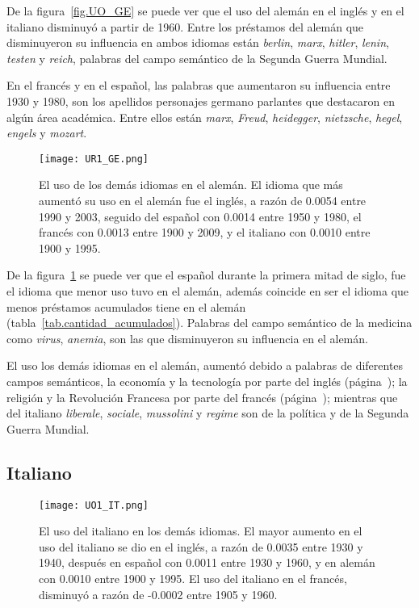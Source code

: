 De la figura~\ref{fig.UO_GE} se puede ver que el uso del alemán en el
inglés y en el italiano disminuyó a partir de 1960. Entre los préstamos del alemán que disminuyeron su influencia en ambos idiomas están \textit{berlin}, \textit{marx}, \textit{hitler}, \textit{lenin}, \textit{testen} y \textit{reich}, palabras del campo semántico de la Segunda Guerra Mundial. 

En el francés y en el español, las palabras que aumentaron su influencia entre 1930 y 1980,  son los apellidos personajes germano parlantes que destacaron en algún área académica. Entre ellos están \textit{marx}, \textit{Freud}, \textit{heidegger}, \textit{nietzsche}, \textit{hegel}, \textit{engels} y \textit{mozart}.

\label{GE-D}


\begin{figure}[h!]
	\centering
	\texttt{[image: UR1\_GE.png]}
	\caption{El uso de los demás idiomas en el alemán. El idioma que más aumentó su uso en el alemán fue el inglés, a razón de 0.0054   entre 1990 y 2003, seguido del español con 0.0014 entre 1950 y 1980, el francés con 0.0013 entre 1900 y 2009, y el italiano con 0.0010 entre 1900 y 1995.}
	\label{fig.UR_GE}
\end{figure}

De la figura~\ref{fig.UR_GE} se puede ver que el español durante la primera mitad de siglo, fue el idioma que menor uso tuvo en el alemán, además coincide en ser el idioma que menos préstamos acumulados tiene en el alemán (tabla~\ref{tab.cantidad_acumulados}). Palabras del campo semántico de la medicina como \textit{virus}, \textit{anemia}, son las que disminuyeron su influencia en el alemán. 

El uso los demás idiomas en el alemán, aumentó debido a palabras de diferentes campos semánticos, la  economía y la tecnología  por parte del inglés (página~\pageref{EN-D}); la religión y la Revolución Francesa por parte del francés (página~\pageref{FR-D}); mientras que del italiano 
\textit{liberale}, \textit{sociale}, \textit{mussolini} y  \textit{regime} 
son de la política y  de la Segunda Guerra Mundial.

\label{D-GE}

\subsection{Italiano} %

\begin{figure}[h!]
	\centering
	\texttt{[image: UO1\_IT.png]}
	\caption{El uso del italiano en los demás idiomas. El mayor aumento en el uso del italiano se dio en el inglés, a razón de 0.0035 entre 1930 y 1940, después en español con 0.0011 entre 1930 y 1960, y en alemán con 0.0010 entre 1900 y 1995. El uso del italiano en el francés, disminuyó a razón de -0.0002  entre 1905 y 1960.}
	\label{fig.UO_IT}
\end{figure}
	
